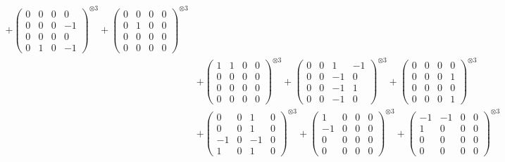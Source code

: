 \documentclass{article}
\begin{document}
{\begin{align}
            + \begin{pmatrix} 0 & 0 & 0 & 0 \\ 0 & 0 & 0 & -1 \\ 0 & 0 & 0 & 0 \\ 0 & 1 & 0 & -1 \end{pmatrix}^{\otimes 3} 
            + \begin{pmatrix} 0 & 0 & 0 & 0 \\ 0 & 1 & 0 & 0 \\ 0 & 0 & 0 & 0 \\ 0 & 0 & 0 & 0 \end{pmatrix}^{\otimes 3} \\
        &+ \label{Rs16-Rc11-Solution-27-c10} \begin{pmatrix} 1 & 1 & 0 & 0 \\ 0 & 0 & 0 & 0 \\ 0 & 0 & 0 & 0 \\ 0 & 0 & 0 & 0 \end{pmatrix}^{\otimes 3} 
            + \begin{pmatrix} 0 & 0 & 1 & -1 \\ 0 & 0 & -1 & 0 \\ 0 & 0 & -1 & 1 \\ 0 & 0 & -1 & 0 \end{pmatrix}^{\otimes 3} 
            + \begin{pmatrix} 0 & 0 & 0 & 0 \\ 0 & 0 & 0 & 1 \\ 0 & 0 & 0 & 0 \\ 0 & 0 & 0 & 1 \end{pmatrix}^{\otimes 3} \\
        &+ \label{Rs16-Rc11-Solution-27-c13} \begin{pmatrix} 0 & 0 & 1 & 0 \\ 0 & 0 & 1 & 0 \\ -1 & 0 & -1 & 0 \\ 1 & 0 & 1 & 0 \end{pmatrix}^{\otimes 3} 
            + \begin{pmatrix} 1 & 0 & 0 & 0 \\ -1 & 0 & 0 & 0 \\ 0 & 0 & 0 & 0 \\ 0 & 0 & 0 & 0 \end{pmatrix}^{\otimes 3} 
            + \begin{pmatrix} -1 & -1 & 0 & 0 \\ 1 & 0 & 0 & 0 \\ 0 & 0 & 0 & 0 \\ 0 & 0 & 0 & 0 \end{pmatrix}^{\otimes 3} \\

\end{align}}
\end{document}
